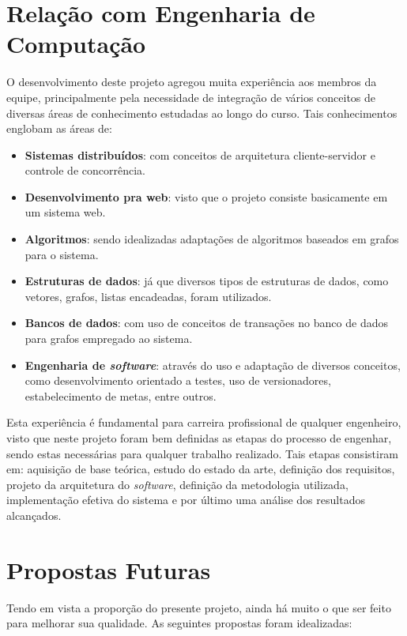 \section{Relação com Engenharia de Computação}
O desenvolvimento deste projeto agregou muita experiência aos membros da equipe, principalmente pela necessidade de integração de vários conceitos de diversas áreas de conhecimento estudadas ao longo do curso.
Tais conhecimentos englobam as áreas de:
\begin{itemize}
	\item \textbf{Sistemas distribuídos}: com conceitos de arquitetura cliente-servidor e controle de concorrência.
	\item \textbf{Desenvolvimento pra web}: visto que o projeto consiste basicamente em um sistema web.
	\item \textbf{Algoritmos}: sendo idealizadas adaptações de algoritmos baseados em grafos para o sistema.
	\item \textbf{Estruturas de dados}: já que diversos tipos de estruturas de dados, como vetores, grafos, listas encadeadas, foram utilizados.
	\item \textbf{Bancos de dados}: com uso de conceitos de transações no banco de dados para grafos empregado ao sistema. 
	\item \textbf{Engenharia de \emph{software}}: através do uso e adaptação de diversos conceitos, como desenvolvimento orientado a testes, uso de versionadores, 			estabelecimento de metas, entre outros.
\end{itemize}

Esta experiência é fundamental para carreira profissional de qualquer engenheiro, visto que neste projeto foram bem definidas as etapas do processo de engenhar, sendo estas necessárias para qualquer trabalho realizado. 
Tais etapas consistiram em: aquisição de base teórica, estudo do estado da arte, definição dos requisitos, projeto da arquitetura do \emph{software}, definição da metodologia utilizada, implementação efetiva do sistema e por último uma análise dos resultados alcançados. 

\section{Propostas Futuras}

Tendo em vista a proporção do presente projeto, ainda há muito o que ser feito para melhorar sua qualidade.
As seguintes propostas foram idealizadas:

